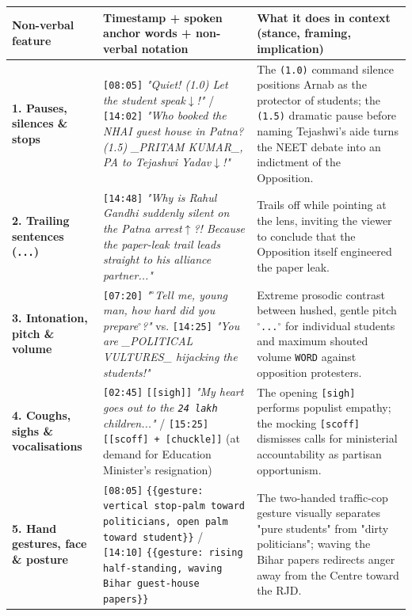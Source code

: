 \documentclass[10pt,a4paper]{article}
\begin{document}
\begin{longtable}{|p{}|p{}|p{}|}
\hline
Non-verbal feature & Timestamp + spoken anchor words + non-verbal notation & What it does in context (stance, framing, implication) \\ \hline \endhead
\textbf{1. Pauses, silences \& stops} & \texttt{[08:05]} \textit{"Quiet! (1.0) Let the student speak$\downarrow$!"} / \texttt{[14:02]} \textit{"Who booked the NHAI guest house in Patna? (1.5) \_PRITAM KUMAR\_, PA to Tejashwi Yadav$\downarrow$!"} & The \texttt{(1.0)} command silence positions Arnab as the protector of students; the \texttt{(1.5)} dramatic pause before naming Tejashwi's aide turns the NEET debate into an indictment of the Opposition. \\ \hline
\textbf{2. Trailing sentences (\texttt{...})} & \texttt{[14:48]} \textit{"Why is Rahul Gandhi suddenly silent on the Patna arrest$\uparrow$?! Because the paper-leak trail leads straight to his alliance partner..."} & Trails off while pointing at the lens, inviting the viewer to conclude that the Opposition itself engineered the paper leak. \\ \hline
\textbf{3. Intonation, pitch \& volume} & \texttt{[07:20]} \textit{"$^\circ$Tell me, young man, how hard did you prepare$^\circ$?"} vs. \texttt{[14:25]} \textit{"You are \_POLITICAL VULTURES\_ hijacking the students!"} & Extreme prosodic contrast between hushed, gentle pitch \texttt{$^\circ$...$^\circ$} for individual students and maximum shouted volume \texttt{WORD} against opposition protesters. \\ \hline
\textbf{4. Coughs, sighs \& vocalisations} & \texttt{[02:45]} \texttt{[[sigh]]} \textit{"My heart goes out to the \texttt{24 lakh} children..."} / \texttt{[15:25]} \texttt{[[scoff] + [chuckle]]} (at demand for Education Minister's resignation) & The opening \texttt{[sigh]} performs populist empathy; the mocking \texttt{[scoff]} dismisses calls for ministerial accountability as partisan opportunism. \\ \hline
\textbf{5. Hand gestures, face \& posture} & \texttt{[08:05]} \texttt{\{\{gesture: vertical stop-palm toward politicians, open palm toward student\}\}} / \texttt{[14:10]} \texttt{\{\{gesture: rising half-standing, waving Bihar guest-house papers\}\}} & The two-handed traffic-cop gesture visually separates "pure students" from "dirty politicians"; waving the Bihar papers redirects anger away from the Centre toward the RJD. \\ \hline
\end{longtable}
\end{document}

